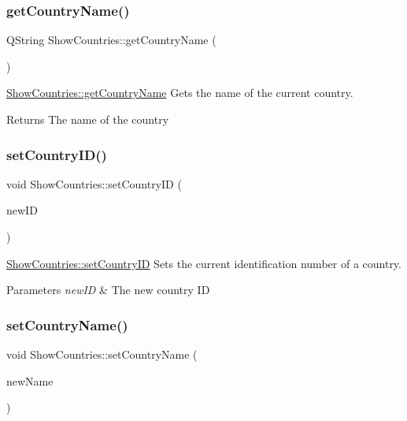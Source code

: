 \subsubsection{\texorpdfstring{get\+Country\+Name()}{getCountryName()}}
{\footnotesize\ttfamily Q\+String Show\+Countries\+::get\+Country\+Name (\begin{DoxyParamCaption}{ }\end{DoxyParamCaption})}



\hyperlink{class_show_countries_afc6d5f6817bd4c9388aef3d52d09d768}{Show\+Countries\+::get\+Country\+Name} Gets the name of the current country. 

\begin{DoxyReturn}{Returns}
The name of the country 
\end{DoxyReturn}
\mbox{\label{class_show_countries_a751b9d3c6859102f48d3ecc254135906}} 
\subsubsection{\texorpdfstring{set\+Country\+I\+D()}{setCountryID()}}
{\footnotesize\ttfamily void Show\+Countries\+::set\+Country\+ID (\begin{DoxyParamCaption}\item[{int}]{new\+ID }\end{DoxyParamCaption})}



\hyperlink{class_show_countries_a751b9d3c6859102f48d3ecc254135906}{Show\+Countries\+::set\+Country\+ID} Sets the current identification number of a country. 


\begin{DoxyParams}{Parameters}
{\em new\+ID} & The new country ID \\
\hline
\end{DoxyParams}
\mbox{\label{class_show_countries_aefa9daeff484f4028ea5a280b280dd36}} 
\subsubsection{\texorpdfstring{set\+Country\+Name()}{setCountryName()}}
{\footnotesize\ttfamily void Show\+Countries\+::set\+Country\+Name (\begin{DoxyParamCaption}\item[{Q\+String}]{new\+Name }\end{DoxyParamCaption})}



